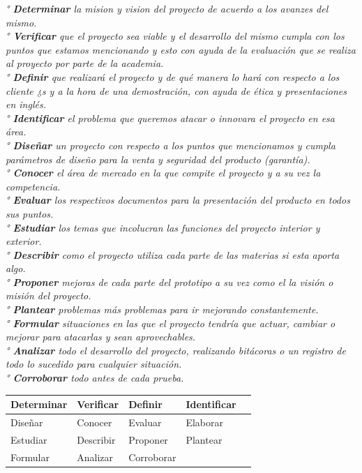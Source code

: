 \documentclass[11pt,a4paper]{article}
\begin{document}
\textit{° \textbf{Determinar} la mision y vision del proyecto de acuerdo a los avanzes del mismo.\\
° \textbf{Verificar} que el proyecto sea viable y el desarrollo del mismo cumpla con los puntos que estamos mencionando y esto con ayuda de la evaluación que se realiza al proyecto por parte de la academia.\\
° \textbf{Definir} que realizará el proyecto y de qué manera lo hará con respecto a los cliente ¿s y a la hora de una demostración, con ayuda de ética y presentaciones en inglés.\\
° \textbf{Identificar} el problema que queremos atacar o innovara el proyecto en esa área.\\
° \textbf{Diseñar} un proyecto con respecto a los puntos que mencionamos y cumpla parámetros de diseño para la venta y seguridad del producto (garantía).\\
° \textbf{Conocer} el área de mercado en la que compite el proyecto y a su vez la competencia.\\
° \textbf{Evaluar} los respectivos documentos para la presentación del producto en todos sus puntos.\\
° \textbf{Estudiar} los temas que incolucran las funciones del proyecto interior y exterior.\\
° \textbf{Describir} como el proyecto utiliza cada parte de las materias si esta aporta algo.\\
° \textbf{Proponer} mejoras de cada parte del prototipo a su vez como el la visión o misión del proyecto.\\
° \textbf{Plantear} problemas más problemas para ir mejorando constantemente.\\
° \textbf{Formular} situaciones en las que el proyecto tendría que actuar, cambiar o mejorar para atacarlas y sean aprovechables.\\
° \textbf{Analizar} todo el desarrollo del proyecto, realizando bitácoras o un registro de todo lo sucedido para cualquier situación.\\
° \textbf{Corroborar} todo antes de cada prueba.\\ }



\begin{table}
\centering
\begin{tabular}{lllll}
Determinar & Verificar & Definir & Identificar \\ \hline 
Diseñar & Conocer & Evaluar & Elaborar \\ \hline
Estudiar & Describir & Proponer & Plantear \\ \hline
Formular & Analizar & Corroborar &  \\ \hline
\end{tabular}
\end{table}
\end{document}
